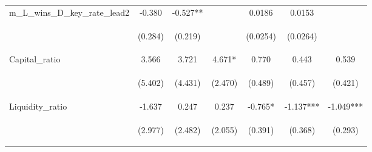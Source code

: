 \documentclass[]{article}
\begin{document}
\begin{center}
\begin{tabular}{lcccccc}
m\_L\_wins\_D\_key\_rate\_lead2 & -0.380 & -0.527** &  & 0.0186 & 0.0153 &  \\
\vspace{4pt} & \begin{footnotesize}(0.284)\end{footnotesize} & \begin{footnotesize}(0.219)\end{footnotesize} & \begin{footnotesize}\end{footnotesize} & \begin{footnotesize}(0.0254)\end{footnotesize} & \begin{footnotesize}(0.0264)\end{footnotesize} & \begin{footnotesize}\end{footnotesize} \\
Capital\_ratio & 3.566 & 3.721 & 4.671* & 0.770 & 0.443 & 0.539 \\
\vspace{4pt} & \begin{footnotesize}(5.402)\end{footnotesize} & \begin{footnotesize}(4.431)\end{footnotesize} & \begin{footnotesize}(2.470)\end{footnotesize} & \begin{footnotesize}(0.489)\end{footnotesize} & \begin{footnotesize}(0.457)\end{footnotesize} & \begin{footnotesize}(0.421)\end{footnotesize} \\
Liquidity\_ratio & -1.637 & 0.247 & 0.237 & -0.765* & -1.137*** & -1.049*** \\
\vspace{4pt} & \begin{footnotesize}(2.977)\end{footnotesize} & \begin{footnotesize}(2.482)\end{footnotesize} & \begin{footnotesize}(2.055)\end{footnotesize} & \begin{footnotesize}(0.391)\end{footnotesize} & \begin{footnotesize}(0.368)\end{footnotesize} & \begin{footnotesize}(0.293)\end{footnotesize} \\

\end{tabular}
\end{center}
\end{document}
